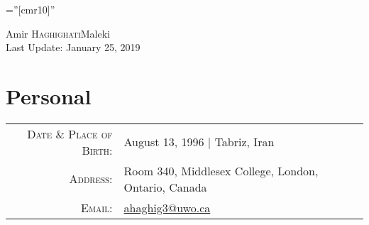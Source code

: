 \documentclass[a4paper,10pt]{article}
\begin{document}
\font\fb=''[cmr10]'' %

\par{\centering
		{\Huge Amir \textsc{Haghighati}Maleki\\
		\small{Last Update: January 25, 2019}
		}
	\bigskip\par
}
\section{Personal}

\begin{tabular}{rl}
    \textsc{Date \& Place of Birth:} & August 13, 1996 | Tabriz, Iran \\
    \textsc{Address:}   & Room 340, Middlesex College, London, Ontario, Canada \\
    \textsc{Email:}     & \href{mailto:ahaghig3@uwo.ca}{ahaghig3@uwo.ca} \\
\end{tabular}

\end{document}

